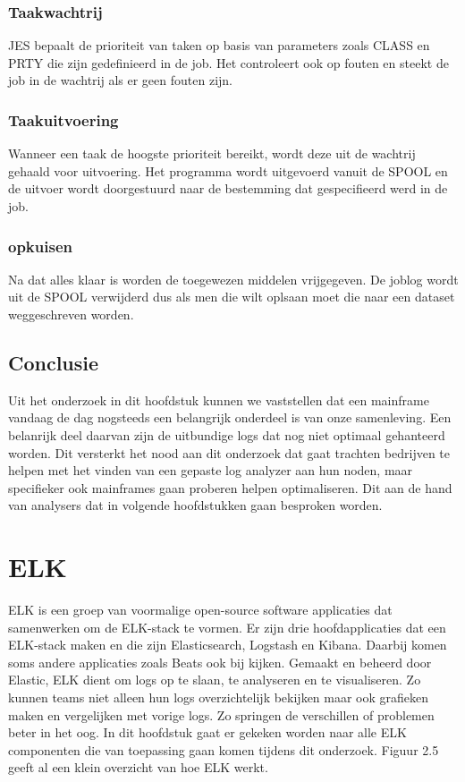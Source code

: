 \subsubsection{Taakwachtrij}
JES bepaalt de prioriteit van taken op basis van parameters zoals CLASS en PRTY die zijn gedefinieerd in de job. Het controleert ook op fouten en steekt de job in de wachtrij als er geen fouten zijn.

\subsubsection{Taakuitvoering}
Wanneer een taak de hoogste prioriteit bereikt, wordt deze uit de wachtrij gehaald voor uitvoering. Het programma wordt uitgevoerd vanuit de SPOOL en de uitvoer wordt doorgestuurd naar de bestemming dat gespecifieerd werd in de job.

\subsubsection{opkuisen}
Na dat alles klaar is worden de toegewezen middelen vrijgegeven. De joblog wordt uit de SPOOL verwijderd dus als men die wilt oplsaan moet die naar een dataset weggeschreven worden.

\subsection{Conclusie}
Uit het onderzoek in dit hoofdstuk kunnen we vaststellen dat een mainframe vandaag de dag nogsteeds een belangrijk onderdeel is van onze samenleving. Een belanrijk deel daarvan zijn de uitbundige logs dat nog niet optimaal gehanteerd worden. Dit versterkt het nood aan dit onderzoek dat gaat trachten bedrijven te helpen met het vinden van een gepaste log analyzer aan hun noden, maar specifieker ook mainframes gaan proberen helpen optimaliseren. Dit aan de hand van analysers dat in volgende hoofdstukken gaan besproken worden. 

\section{ELK}
ELK is een groep van voormalige open-source software applicaties dat samenwerken om de ELK-stack te vormen. Er zijn drie hoofdapplicaties dat een ELK-stack maken en die zijn Elasticsearch, Logstash en Kibana. Daarbij komen soms andere applicaties zoals Beats ook bij kijken. Gemaakt en beheerd door Elastic, ELK dient om logs op te slaan, te analyseren en te visualiseren. Zo kunnen teams niet alleen hun logs overzichtelijk bekijken maar ook grafieken maken en vergelijken met vorige logs. Zo springen de verschillen of problemen beter in het oog. In dit hoofdstuk gaat er gekeken worden naar alle ELK componenten die van toepassing gaan komen tijdens dit onderzoek. Figuur 2.5 ~\autocite{DavidTaylor} geeft al een klein overzicht van hoe ELK werkt.~\autocite{DavidTaylor,DotanHorovits}


